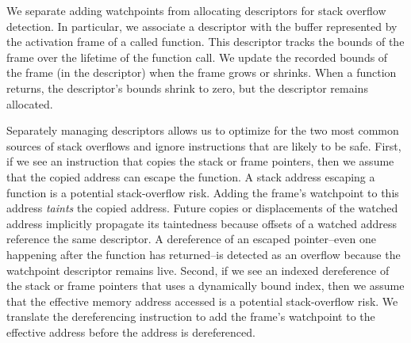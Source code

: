 \documentclass[letterpaper,twocolumn,10pt]{article}
\begin{document}

We separate adding watchpoints from allocating descriptors for stack overflow detection. In particular, we associate a descriptor with the buffer represented by the activation frame of a called function. This descriptor tracks the bounds of the frame over the lifetime of the function call. We update the recorded bounds of the frame (in the descriptor) when the frame grows or shrinks. When a function returns, the descriptor's bounds shrink to zero, but the descriptor remains allocated.


Separately managing descriptors allows us to optimize for the two most common sources of stack overflows and ignore instructions that are likely to be safe. First, if we see an instruction that copies the stack or frame pointers, then we assume that the copied address can escape the function. A stack address escaping a function is a potential stack-overflow risk. Adding the frame's watchpoint to this address \emph{taints} the copied address. Future copies or displacements of the watched address implicitly propagate its taintedness because offsets of a watched address reference the same descriptor. A dereference of an escaped pointer--even one happening after the function has returned--is detected as an overflow because the watchpoint descriptor remains live. Second, if we see an indexed dereference of the stack or frame pointers that uses a dynamically bound index, then we assume that the effective memory address accessed is a potential stack-overflow risk. We translate the dereferencing instruction to add the frame's watchpoint to the effective address before the address is dereferenced.


\end{document}
